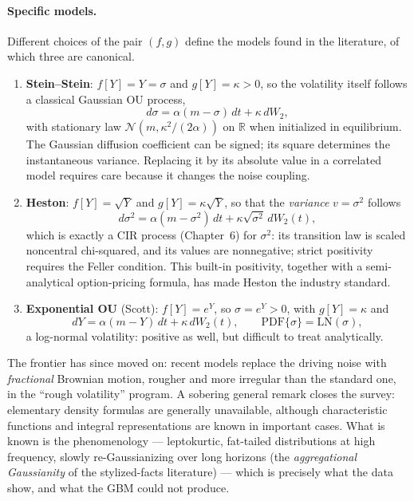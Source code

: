 \paragraph*{Specific models.}

Different choices of the pair $(f,g)$ define the models found in the literature, of which three are canonical.

\begin{enumerate}
    \item \textbf{Stein--Stein}\cite{SteinStein1991}: $f[Y] = Y = \sigma$ and $g[Y] = \kappa > 0$, so the volatility itself follows a classical Gaussian OU process,
    \begin{equation}
    d\sigma = \alpha(m-\sigma)\,dt + \kappa\, dW_2,
    \end{equation}
    with stationary law $\mathcal N(m,\kappa^2/(2\alpha))$ on $\mathbb R$ when initialized in equilibrium.
    The Gaussian diffusion coefficient can be signed; its square determines the instantaneous variance.
Replacing it by its absolute value in a correlated model requires care because it changes the noise coupling.

    \item \textbf{Heston}\cite{Heston1993}: $f[Y] = \sqrt{Y}$ and $g[Y] = \kappa\sqrt{Y}$, so that the \emph{variance} $v=\sigma^2$ follows
    \begin{equation}
    d\sigma^2 = \alpha(m-\sigma^2)\,dt + \kappa\sqrt{\sigma^2}\, dW_2(t),
    \end{equation}
    which is exactly a CIR process (Chapter~6) for $\sigma^2$: its transition law is scaled noncentral chi-squared, and its values are nonnegative; strict positivity requires the Feller condition.
    This built-in positivity, together with a semi-analytical option-pricing formula, has made Heston the industry standard.

    \item \textbf{Exponential OU} (Scott\cite{Scott1987}): $f[Y] = e^Y$, so $\sigma = e^Y > 0$, with $g[Y] = \kappa$ and
    \begin{equation}
    dY = \alpha(m-Y)\,dt + \kappa\, dW_2(t), \qquad \mathrm{PDF}\{\sigma\} = \mathrm{LN}(\sigma),
    \end{equation}
    a log-normal volatility: positive as well, but difficult to treat analytically.
\end{enumerate}

The frontier has since moved on: recent models replace the driving noise with \emph{fractional} Brownian motion, rougher and more irregular than the standard one, in the ``rough volatility'' program.
A sobering general remark closes the survey: elementary density formulas are generally unavailable, although characteristic functions and integral representations are known in important cases.
What is known is the phenomenology --- leptokurtic, fat-tailed distributions at high frequency, slowly re-Gaussianizing over long horizons (the \emph{aggregational Gaussianity} of the stylized-facts literature\cite{Cont2001}) --- which is precisely what the data show, and what the GBM could not produce.


